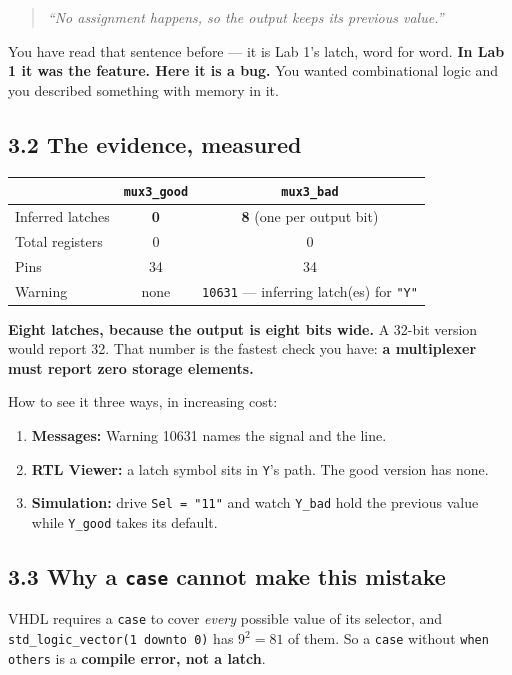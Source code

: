 \documentclass[11pt]{article}
\newcommand{\code}[1]{\texttt{#1}}
\begin{document}
\begin{quote}
\emph{``No assignment happens, so the output keeps its previous value.''}
\end{quote}

You have read that sentence before --- it is Lab 1's latch, word for word.
\textbf{In Lab 1 it was the feature. Here it is a bug.} You wanted combinational
logic and you described something with memory in it.

\subsection*{3.2 The evidence, measured}

\begin{center}
\begin{tabular}{lcc}
\toprule
& \code{mux3\_good} & \code{mux3\_bad} \\
\midrule
Inferred latches & \textbf{0} & \textbf{8} \quad (one per output bit) \\
Total registers & 0 & 0 \\
Pins & 34 & 34 \\
Warning & none & \code{10631} --- inferring latch(es) for \code{"Y"} \\
\bottomrule
\end{tabular}
\end{center}

\textbf{Eight latches, because the output is eight bits wide.} A 32-bit version
would report 32. That number is the fastest check you have: \textbf{a multiplexer
must report zero storage elements.}

How to see it three ways, in increasing cost:
\begin{enumerate}[leftmargin=2em,itemsep=1pt]
\item \textbf{Messages:} Warning 10631 names the signal and the line.
\item \textbf{RTL Viewer:} a latch symbol sits in \code{Y}'s path. The good
version has none.
\item \textbf{Simulation:} drive \code{Sel = "11"} and watch \code{Y\_bad} hold
the previous value while \code{Y\_good} takes its default.
\end{enumerate}

\subsection*{3.3 Why a \code{case} cannot make this mistake}

VHDL requires a \code{case} to cover \emph{every} possible value of its selector,
and \code{std\_logic\_vector(1 downto 0)} has $9^2 = 81$ of them. So a \code{case}
without \code{when others} is a \textbf{compile error, not a latch}.
\end{document}
